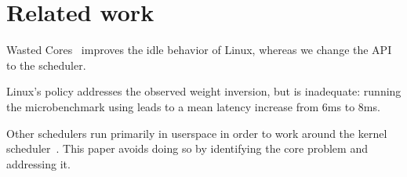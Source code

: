 \section{Related work}

Wasted Cores~\cite{wasted-cores} improves the idle behavior of Linux, whereas we
change the API to the scheduler.

Linux's \schedidle{} policy addresses the observed weight inversion, but is
inadequate: running the microbenchmark using \schedidle{} leads to a mean
latency increase from 6ms to 8ms.

Other schedulers run primarily in userspace in order to work around the kernel
scheduler~\cite{perfiso,caladan,skyloft}. This paper avoids doing so by
identifying the core problem and addressing it.